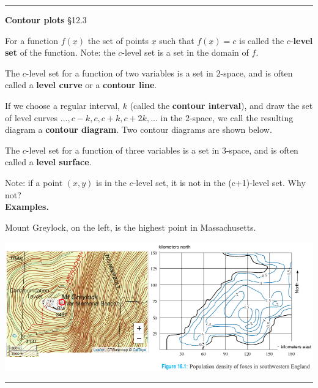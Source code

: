 \documentclass[12pt,letterpaper,noanswers]{exam}
\begin{document}
\vspace{0.2cm}
\hrule
\vspace{0.2cm}
\noindent\textbf{Contour plots} \S 12.3
\begin{tcolorbox}
For a function $f(\underline{x})$ the set of points $\underline{x}$ such that $f(\underline{x}) = c$ is called the $c$-\textbf{level set} of the function.  Note: the $c$-level set is a set in the domain of $f$.

The $c$-level set for a function of two variables is a set in $2$-space, and is often called a \textbf{level curve} or a \textbf{contour line}.  

If we choose a regular interval, $k$ (called the \textbf{contour interval}), and draw the set of level curves $..., c-k, c, c+k, c+2k, ...$ in the $2$-space, we call the resulting diagram a \textbf{contour diagram}.  Two contour diagrams are shown below.

The $c$-level set for a function of three variables is a set in $3$-space, and is often called a \textbf{level surface}.  




\end{tcolorbox}




Note: if a point $(x,y)$ is in the $c$-level set, it is not in the (c+1)-level set.  Why not? \\

\noindent\textbf{Examples.}

Mount Greylock, on the left, is the highest point in Massachusetts.

\begin{center}
\includegraphics[width=0.9\linewidth]{img/C03contours.png}
\end{center}


\vspace{0.2cm}
\hrule
\vspace{0.2cm}
\end{document}
